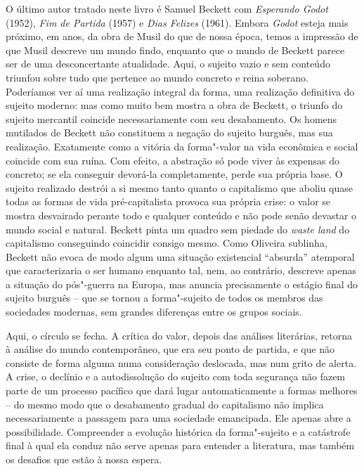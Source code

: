 O último autor tratado neste livro é Samuel Beckett com \emph{Esperando
Godot} (1952), \emph{Fim de Partida} (1957) e \emph{Dias Felizes}
(1961). Embora \emph{Godot} esteja mais próximo, em anos, da obra de
Musil do que de nossa época, temos a impressão de que Musil descreve um
mundo findo, enquanto que o mundo de Beckett parece ser de uma
desconcertante atualidade. Aqui, o sujeito vazio e sem conteúdo triunfou
sobre tudo que pertence ao mundo concreto e reina soberano. Poderíamos
ver aí uma realização integral da forma, uma realização definitiva do
sujeito moderno: mas como muito bem mostra a obra de Beckett, o triunfo
do sujeito mercantil coincide necessariamente com seu desabamento. Os
homens mutilados de Beckett não constituem a negação do sujeito burguês,
mas sua realização. Exatamente como a vitória da forma"-valor na vida
econômica e social coincide com sua ruína. Com efeito, a abstração só
pode viver às expensas do concreto; se ela conseguir devorá-la
completamente, perde sua própria base. O sujeito realizado destrói a si
mesmo tanto quanto o capitalismo que aboliu quase todas as formas de
vida pré-capitalista provoca sua própria crise: o valor se mostra desvairado perante
todo e qualquer conteúdo e não pode senão devastar o mundo social e
natural. Beckett pinta um quadro sem piedade do \emph{waste land} do
capitalismo conseguindo coincidir consigo mesmo. Como Oliveira sublinha,
Beckett não evoca de modo algum uma situação existencial ``absurda''
atemporal que caracterizaria o ser humano enquanto tal, nem, ao
contrário, descreve apenas a situação do pós"-guerra na Europa, mas
anuncia precisamente o estágio final do sujeito burguês -- que se tornou
a forma"-sujeito de todos os membros das sociedades modernas, sem grandes
diferenças entre os grupos sociais.

Aqui, o círculo se fecha. A crítica do valor, depois das análises
literárias, retorna à análise do mundo contemporâneo, que era seu ponto
de partida, e que não consiste de forma alguma numa consideração
deslocada, mas num grito de alerta. A crise, o declínio e a
autodissolução do sujeito com toda segurança não fazem parte de um
processo pacífico que dará lugar automaticamente a formas melhores -- do
mesmo modo que o desabamento gradual do capitalismo não implica
necessariamente a passagem para uma sociedade emancipada. Ele apenas
abre a possibilidade. Compreender a evolução histórica da forma"-sujeito
e a catástrofe final à qual ela conduz não serve apenas para entender a
literatura, mas também os desafios que estão à nossa espera.

